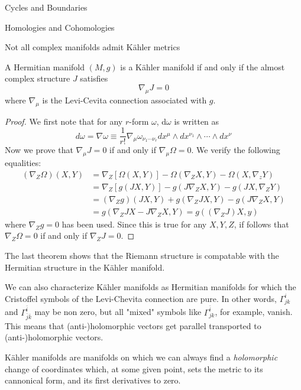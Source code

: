 \begin{subsubsection}{Cycles and Boundaries}
\begin{subsubsection}{Homologies and Cohomologies}
\begin{definition}
\begin{definition}
\begin{remark}
Not all complex manifolds admit K\"ahler metrics
\end{remark}

\begin{theorem}
A Hermitian manifold $(M,g)$ is a K\"ahler manifold if and only if the almost
  complex structure $J$ satisfies
\begin{equation}
\nabla_\mu J = 0
\end{equation}
where $\nabla_\mu$ is the Levi-Cevita connection associated with $g$.
\end{theorem}

\begin{proof}
We first note that for any $r$-form $\omega$, d$\omega$ is written as
\begin{equation}
  d\omega = \nabla\omega \equiv
  \frac{1}{r!}\nabla_\mu\omega_{\nu_1\cdots\nu_r}dx^\mu\wedge
  dx^{\nu_1}\wedge\cdots\wedge dx^{\nu}    
\end{equation}
Now we prove that $\nabla_\mu J = 0$ if and only if $\nabla_\mu\Omega = 0$. We
verify the following equalities:
\begin{align}
(\nabla_Z\Omega)(X,Y)
  &= \nabla_Z\left[\Omega(X,Y)\right]-\Omega(\nabla_ZX,Y)-\Omega(X,\nabla_z Y)\\
  &= \nabla_Z\left[g(JX,Y)\right] - g(J\nabla_Z X,Y) - g(JX, \nabla_Z Y)\\
  &= (\nabla_Z g)(JX,Y) + g(\nabla_ZJX,Y) - g(J\nabla_ZX,Y)\\
  &= g(\nabla_ZJX-J\nabla_ZX,Y) = g((\nabla_ZJ)X,y)
\end{align}
where $\nabla_Z g = 0$ has been used. Since this is true for any $X,Y,Z$, if
  follows that $\nabla_Z\Omega = 0$ if and only if $\nabla_Z J = 0$.
\end{proof}
The last theorem shows that the Riemann structure is compatable with the
Hermitian structure in the K\"ahler manifold.

We can also characterize K\"ahler manifolds as Hermitian manifolds for which
the Cristoffel symbols of the Levi-Chevita connection are pure. In other words,
$\Gamma_{jk}^i$ and $\Gamma_{\bar{j}\bar{k}}^{\bar{i}}$ may be non zero, but
all "mixed" symbols like $\Gamma_{jk}^{\bar{i}}$, for example, vanish. This
means that (anti-)holomorphic vectors get parallel transported to
(anti-)holomorphic vectors.

K\"ahler manifolds are manifolds on which we can always find
a \textit{holomorphic} change of coordinates which, at some given point, sets
the metric to its cannonical form, and its first derivatives to zero.


\end{definition}
\end{definition}
\end{subsubsection}
\end{subsubsection}
